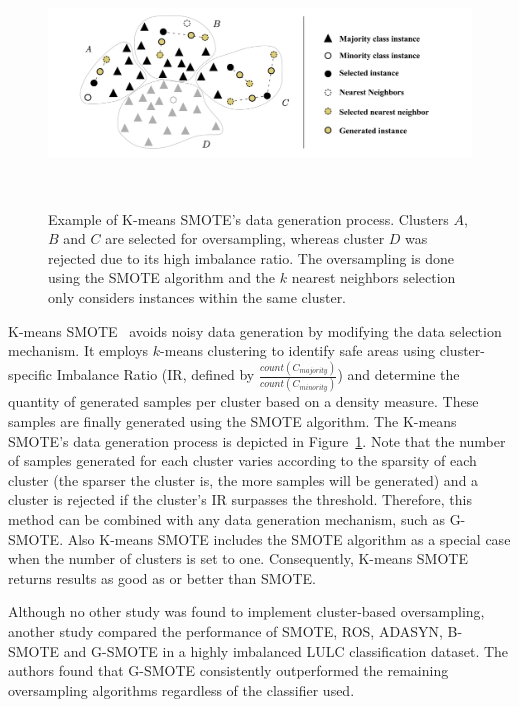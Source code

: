 \begin{figure}
	\centering
	\includegraphics[width=1\linewidth]{kmeans_smote_example}
    \caption[Example of K-means SMOTE's data generation process.]{Example of
        K-means SMOTE's data generation process. Clusters $A$, $B$ and $C$ are
        selected for oversampling, whereas cluster $D$ was rejected due to its
        high imbalance ratio. The oversampling is done using the SMOTE
        algorithm and the $k$ nearest neighbors selection only considers
        instances within the same cluster.
    }~\label{fig:kmeans_smote_example}
\end{figure}

K-means SMOTE~\cite{Douzas2018} avoids noisy data generation by modifying the
data selection mechanism. It employs $k$-means clustering to identify safe
areas using cluster-specific Imbalance Ratio (IR, defined by
$\frac{count(C_{majority})}{count(C_{minority})}$) and determine the quantity
of generated samples per cluster based on a density measure. These samples are
finally generated using the SMOTE algorithm. The K-means SMOTE's data
generation process is depicted in Figure~\ref{fig:kmeans_smote_example}. Note
that the number of samples generated for each cluster varies according to the
sparsity of each cluster (the sparser the cluster is, the more samples will be
generated) and a cluster is rejected if the cluster's IR surpasses the
threshold.  Therefore, this method can be combined with any data generation
mechanism, such as G-SMOTE.  Also K-means SMOTE includes the SMOTE algorithm
as a special case when the number of clusters is set to one. Consequently,
K-means SMOTE returns results as good as or better than SMOTE.

Although no other study was found to implement cluster-based oversampling,
another study \cite{Douzas2019rs} compared the performance of SMOTE, ROS,
ADASYN, B-SMOTE and G-SMOTE in a highly imbalanced LULC classification dataset.
The authors found that G-SMOTE consistently outperformed the remaining
oversampling algorithms regardless of the classifier used.

